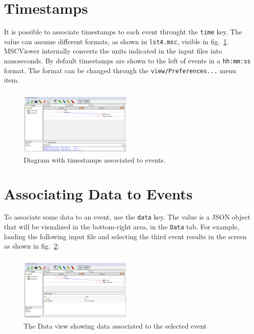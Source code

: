 \documentclass[11pt, twoside, titlepage]{book}
\newcommand{\prog}{MSCViewer}
\begin{document}
\section{Timestamps}
It is possible to associate timestamps to each event throught the \texttt{time}
key. The value can assume different formats, as shown in \texttt{lst4.msc},
visible in fig.~\ref{fig:gui-lst4}. \prog{} internally converts the units
indicated in the input files into nanoseconds. By default timestamps are shown
to the left of events in a \texttt{hh:mm:ss} format. The format can be changed
through the \texttt{view/Preferences...} menu item.

%
\begin{figure}[ht!]
  \centering
  \includegraphics[width=0.5\textwidth,natwidth=1024,natheight=600]{images/gui-ex4-time.png}
  \caption{Diagram with timestamps associated to events.}
  \label{fig:gui-lst4}
\end{figure} 


\section{Associating Data to Events}
To associate some data to an event, use the \texttt{data} key. The value is a
JSON object that will be visualized in the bottom-right area, in the
\texttt{Data} tab. For example, loading the following input file  and selecting
the third event results in the screen as shown in fig.~\ref{fig:gui-lst5}:

\begin{minipage}{\linewidth} 

\end{minipage}


\begin{figure}[ht!]
  \centering
  \includegraphics[width=0.5\textwidth,natwidth=1024,natheight=600]{images/gui-ex5-data.png}
  \caption{The Data view showing data associated to the selected event}
  \label{fig:gui-lst5}
\end{figure}
\end{document}
